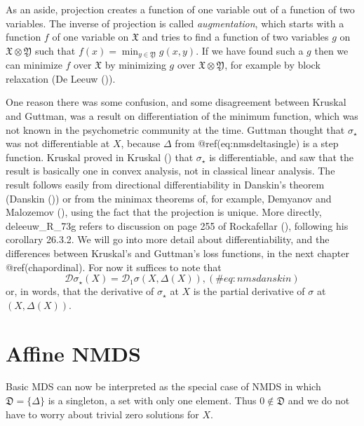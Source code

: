 \documentclass[
  12pt,
  letterpaper,
  DIV=11,
  numbers=noendperiod]{scrreprt}
\theoremstyle{remark}
\begin{document}
As an aside, projection creates a function of one variable out of a
function of two variables. The inverse of projection is called
\emph{augmentation}, which starts with a function \(f\) of one variable
on \(\mathfrak{X}\) and tries to find a function of two variables \(g\)
on \(\mathfrak{X}\otimes\mathfrak{Y}\) such that
\(f(x)=\min_{y\in\mathfrak{Y}} g(x,y)\). If we have found such a \(g\)
then we can minimize \(f\) over \(\mathfrak{X}\) by minimizing \(g\)
over \(\mathfrak{X}\otimes\mathfrak{Y}\), for example by block
relaxation (De Leeuw ()).

One reason there was some confusion, and some disagreement between
Kruskal and Guttman, was a result on differentiation of the minimum
function, which was not known in the psychometric community at the time.
Guttman thought that \(\sigma_\star\) was not differentiable at \(X\),
because \(\Delta\) from @ref(eq:nmsdeltasingle) is a step function.
Kruskal proved in Kruskal () that
\(\sigma_\star\) is differentiable, and saw that the result is basically
one in convex analysis, not in classical linear analysis. The result
follows easily from directional differentiability in Danskin's theorem
(Danskin ()) or from the minimax theorems
of, for example, Demyanov and Malozemov
(), using the fact that the
projection is unique. More directly, deleeuw\_R\_73g refers to
discussion on page 255 of Rockafellar
(), following his corollary 26.3.2.
We will go into more detail about differentiability, and the differences
between Kruskal's and Guttman's loss functions, in the next chapter
@ref(chapordinal). For now it suffices to note that \begin{equation}
\mathcal{D}\sigma_\star(X)=\mathcal{D}_1\sigma(X,\Delta(X)),
(\#eq:nmsdanskin)
\end{equation} or, in words, that the derivative of \(\sigma_\star\) at
\(X\) is the partial derivative of \(\sigma\) at \((X,\Delta(X))\).

\section{Affine NMDS}\label{affine-nmds}

Basic MDS can now be interpreted as the special case of NMDS in which
\(\mathfrak{D}=\{\Delta\}\) is a singleton, a set with only one element.
Thus \(0\not\in\mathfrak{D}\) and we do not have to worry about trivial
zero solutions for \(X\).
\end{document}
